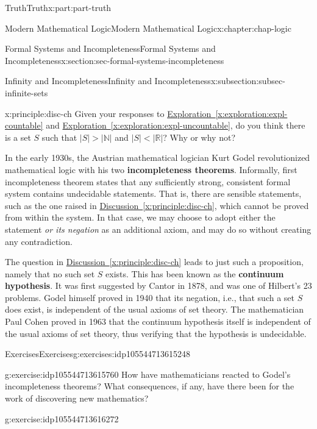 \documentclass[oneside,10pt,]{book}
\newcommand{\xreffont}{\relax}
\newcommand{\terminology}[1]{\textbf{#1}}
\numberwithin{equation}{section}
\newcommand{\lt}{<}
\newcommand{\gt}{>}
\begin{document}
\begin{partptx}{Truth}{}{Truth}{}{}{x:part:part-truth}
\begin{chapterptx}{Modern Mathematical Logic}{}{Modern Mathematical Logic}{}{}{x:chapter:chap-logic}
\begin{sectionptx}{Formal Systems and Incompleteness}{}{Formal Systems and Incompleteness}{}{}{x:section:sec-formal-systems-incompleteness}
\begin{subsectionptx}{Infinity and Incompleteness}{}{Infinity and Incompleteness}{}{}{x:subsection:subsec-infinite-sets}
\begin{principle}{}{}{x:principle:disc-ch}
Given your responses to \hyperref[x:exploration:expl-countable]{Exploration~{\xreffont\ref{x:exploration:expl-countable}}} and \hyperref[x:exploration:expl-uncountable]{Exploration~{\xreffont\ref{x:exploration:expl-uncountable}}}, do you think there is a set \(S\) such that \(|S| \gt |\mathbb{N}|\) and \(|S| \lt |\mathbb{R}|\)? Why or why not?%
\end{principle}
 In the early 1930s, the Austrian mathematical logician Kurt Godel revolutionized mathematical logic with his two \terminology{incompleteness theorems}. Informally, first incompleteness theorem states that any sufficiently strong, consistent formal system contains undecidable statements. That is, there are sensible statements, such as the one raised in \hyperref[x:principle:disc-ch]{Discussion~{\xreffont\ref{x:principle:disc-ch}}}, which cannot be proved from within the system. In that case, we may choose to adopt either the statement \emph{or its negation} as an additional axiom, and may do so without creating any contradiction.%
\par
The question in \hyperref[x:principle:disc-ch]{Discussion~{\xreffont\ref{x:principle:disc-ch}}} leads to just such a proposition, namely that no such set \(S\) exists. This has been known as the \terminology{continuum hypothesis}. It was first suggested by Cantor in 1878, and was one of Hilbert's 23 problems. Godel himself proved in 1940 that its negation, i.e., that such a set \(S\) does exist, is independent of the usual axioms of set theory. The mathematician Paul Cohen proved in 1963 that the continuum hypothesis itself is independent of the usual axioms of set theory, thus verifying that the hypothesis is undecidable.%
\end{subsectionptx}
%
%
\typeout{************************************************}
\typeout{************************************************}
%
\begin{exercises-subsection}{Exercises}{}{Exercises}{}{}{g:exercises:idp105544713615248}
\begin{divisionexercise}{1}{}{}{g:exercise:idp105544713615760}%
How have mathematicians reacted to Godel's incompleteness theorems? What consequences, if any, have there been for the work of discovering new mathematics?%
\end{divisionexercise}%
\begin{divisionexercise}{2}{}{}{g:exercise:idp105544713616272}%

\end{divisionexercise}
\end{exercises-subsection}
\end{sectionptx}
\end{chapterptx}
\end{partptx}
\end{document}
